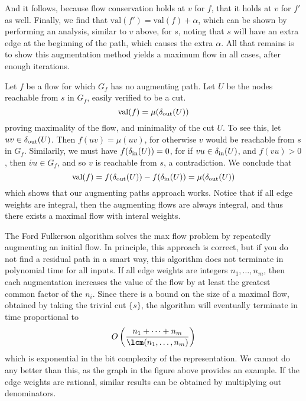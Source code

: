 %
And it follows, because flow conservation holds at $v$ for $f$, that it holds at $v$ for $f'$ as well. Finally, we find that $\text{val}(f') = \text{val}(f) + \alpha$, which can be shown by performing an analysis, similar to $v$ above, for $s$, noting that $s$ will have an extra edge at the beginning of the path, which causes the extra $\alpha$. All that remains is to show this augmentation method yields a maximum flow in all cases, after enough iterations.

Let $f$ be a flow for which $G_f$ has no augmenting path. Let $U$ be the nodes reachable from $s$ in $G_f$, easily verified to be a cut.
%
\[ \text{val}(f) = \mu(\operatorname{\delta_{\text{out}}}(U)) \]
%
proving maximality of the flow, and minimality of the cut $U$. To see this, let $uv \in \operatorname{\delta_{\text{out}}}(U)$. Then $f(uv) = \mu(uv)$, for otherwise $v$ would be reachable from $s$ in $G_f$. Similarily, we must have $f(\operatorname{\delta_{\text{in}}}(U)) = 0$, for if $vu \in \operatorname{\delta_{\text{in}}}(U)$, and $f(vu) > 0$, then $\overleftarrow{vu} \in G_f$, and so $v$ is reachable from $s$, a contradiction. We conclude that
%
\[ \text{val}(f) = f(\operatorname{\delta_{\text{out}}}(U)) - f(\operatorname{\delta_{\text{in}}}(U)) = \mu(\operatorname{\delta_{\text{out}}}(U)) \]
%
which shows that our augmenting paths approach works. Notice that if all edge weights are integral, then the augmenting flows are always integral, and thus there exists a maximal flow with interal weights.

The Ford Fulkerson algorithm solves the max flow problem by repeatedly augmenting an initial flow. In principle, this approach is correct, but if you do not find a residual path in a smart way, this algorithm does not terminate in polynomial time for all inputs. If all edge weights are integers $n_1, \dots, n_m$, then each augmentation increases the value of the flow by at least the greatest common factor of the $n_i$. Since there is a bound on the size of a maximal flow, obtained by taking the trivial cut $\{ s \}$, the algorithm will eventually terminate in time proportional to
%
\[ O \left(\frac{n_1 + \dots + n_m}{\lcm(n_1, \dots, n_m)} \right) \]
%
which is exponential in the bit complexity of the representation. We cannot do any better than this, as the graph in the figure above provides an example. If the edge weights are rational, similar results can be obtained by multiplying out denominators.


